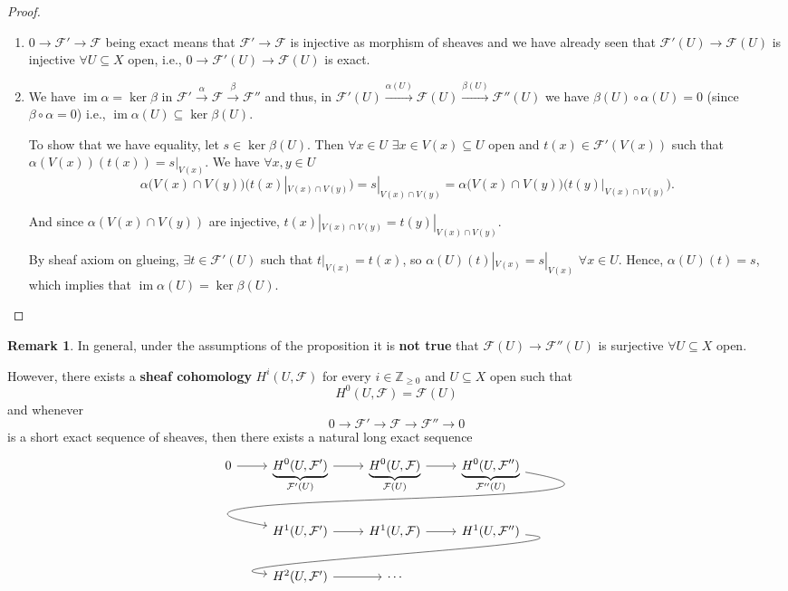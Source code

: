 \documentclass[12pt]{article}
\DeclareMathOperator{\im}{im}
\theoremstyle{definition}
\newtheorem*{remark}{Remark}
\begin{document}
\begin{proof}
\begin{enumerate}[label=\arabic*)]
\item $0\rightarrow\mathcal{F}'\rightarrow\mathcal{F}$ being exact means that $\mathcal{F}'\rightarrow\mathcal{F}$ is injective as morphism of sheaves and we have already seen that $\mathcal{F}'(U)\rightarrow\mathcal{F}(U)$ is injective $\forall U\subseteq X$ open, i.e., $0\rightarrow\mathcal{F}'(U)\rightarrow\mathcal{F}(U)$ is exact.

\item We have $\im\alpha=\ker\beta$ in $\mathcal{F}'\xrightarrow{\alpha}\mathcal{F}\xrightarrow{\beta}\mathcal{F}''$ and thus, in $\mathcal{F}'(U)\xrightarrow{\alpha(U)}\mathcal{F}(U)\xrightarrow{\beta(U)}\mathcal{F}''(U)$ we have $\beta(U)\circ\alpha(U)=0$ (since $\beta\circ\alpha=0$) i.e., $\im\alpha(U)\subseteq\ker\beta(U)$.

To show that we have equality, let $s\in\ker\beta(U)$. Then $\forall x\in U$ $\exists x\in V(x)\subseteq U$ open and $t(x)\in\mathcal{F}'(V(x))$ such that $\alpha(V(x))(t(x))=s|_{V(x)}$. We have $\forall x,y\in U$
\[\alpha\big(V(x)\cap V(y)\big)\big(t(x)|_{V(x)\cap V(y)}\big)=s|_{V(x)\cap V(y)}=\alpha\big(V(x)\cap V(y)\big)\big(t(y)|_{V(x)\cap V(y)}\big).\]

And since $\alpha(V(x)\cap V(y))$ are injective, $t(x)|_{V(x)\cap V(y)}=t(y)|_{V(x)\cap V(y)}$.

By sheaf axiom on glueing, $\exists t\in\mathcal{F}'(U)$ such that $t|_{V(x)}=t(x)$, so $\alpha(U)(t)|_{V(x)}=s|_{V(x)}$ $\forall x\in U$. Hence, $\alpha(U)(t)=s$, which implies that $\im\alpha(U)=\ker\beta(U)$.
\end{enumerate}
\end{proof}

\begin{remark}
In general, under the assumptions of the proposition it is \textbf{not true} that $\mathcal{F}(U)\rightarrow\mathcal{F}''(U)$ is surjective $\forall U\subseteq X$ open.

However, there exists a \textbf{sheaf cohomology} $H^i(U,\mathcal{F})$ for every $i\in\mathbb{Z}_{\geq0}$ and $U\subseteq X$ open such that
\[H^0(U,\mathcal{F})=\mathcal{F}(U)\]
and whenever
\[0\longrightarrow\mathcal{F}'\longrightarrow\mathcal{F}\longrightarrow\mathcal{F}''\longrightarrow0\]
is a short exact sequence of sheaves, then there exists a natural long exact sequence
\[
\begin{tikzcd}
0\arrow[r]&\underbrace{H^0(U,\mathcal{F}')}_{\mathcal{F}'(U)}\arrow[r]&\underbrace{H^0(U,\mathcal{F})}_{\mathcal{F}(U)}\arrow[r]&\underbrace{H^0(U,\mathcal{F}'')}_{\mathcal{F}''(U)}\arrow[out=350,in=170,looseness=2,lld]\\
&H^1(U,\mathcal{F}')\arrow[r]&H^1(U,\mathcal{F})\arrow[r]&H^1(U,\mathcal{F}'')\arrow[out=355,in=175, looseness=1,overlay,lld]\\
&H^2(U,\mathcal{F}')\arrow[r]&\cdots
\end{tikzcd}
\]
\end{remark}
\end{document}
